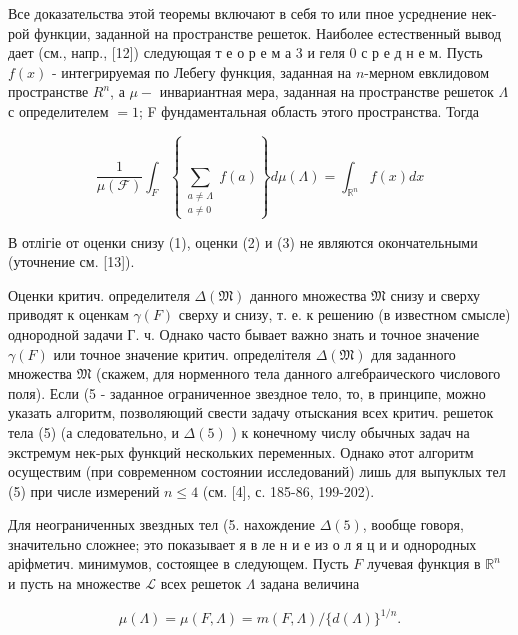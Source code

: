\documentclass[10pt]{article}
\begin{document}
Все доказательства этой теоремы включают в себя то или пное усреднение нек-рой функции, заданной на пространстве решеток. Наиболее естественный вывод дает (см., напр., [12]) следующая т е о р е м а 3 и геля 0 с р е д н е м. Пусть $f(x)$ - интегрируемая по Лебегу функция, заданная на $n$-мерном евклидовом пространстве $R^{n}$, а $\mu-$ инвариантная мера, заданная на пространстве решеток $\Lambda$ с определителем $=1$; F фундаментальная область этого пространства. Тогда



\[

\frac{1}{\mu(\mathcal{F})} \int_{F}\left\{\sum_{\substack{a \neq \Lambda \\ a \neq 0}} f(a)\right\} d \mu(\Lambda)=\int_{\mathbb{R}^{n}} f(x) d x

\]



В отлігіе от оценки снизу (1), оценки (2) и (3) не являются окончательными (уточнение см. [13]).



Оценки критич. определителя $\Delta(\mathfrak{M})$ данного множества $\mathfrak{M}$ снизу и сверху приводят к оценкам $\gamma(F)$ сверху и снизу, т. е. к решению (в известном смысле) однородной задачи Г. ч. Однако часто бывает важно знать и точное значение $\gamma(F)$ или точное значение критич. определітеля $\Delta(\mathfrak{M})$ для заданного множества $\mathfrak{M}$ (скажем, для норменного тела данного алгебраического числового поля). Если (5 - заданное ограниченное звездное тело, то, в принципе, можно указать алгоритм, позволяющий свести задачу отыскания всех критич. решеток тела (5) (а следовательно, и $\Delta(5)$ ) к конечному числу обычных задач на экстремум нек-рых функций нескольких переменных. Однако әтот алгоритм осуществим (при современном состоянии исследований) лишь для выпуклых тел (5) при числе измерений $n \leqslant 4$ (см. [4], с. 185-86, 199-202).



Для неограниченных звездных тел (5. нахождение $\Delta(5)$, вообще говоря, значительно сложнее; это показывает я в ле н и е из о л я ц и и однородных аріфметич. минимумов, состоящее в следующем. Пусть $F$ лучевая функция в $\mathbb{R}^{n}$ и пусть на множестве $\mathscr{L}$ всех решеток $\Lambda$ задана величина



\[

\mu(\Lambda)=\mu(F, \Lambda)=m(F, \Lambda) /\{d(\Lambda)\}^{1 / n} .

\]
\end{document}
